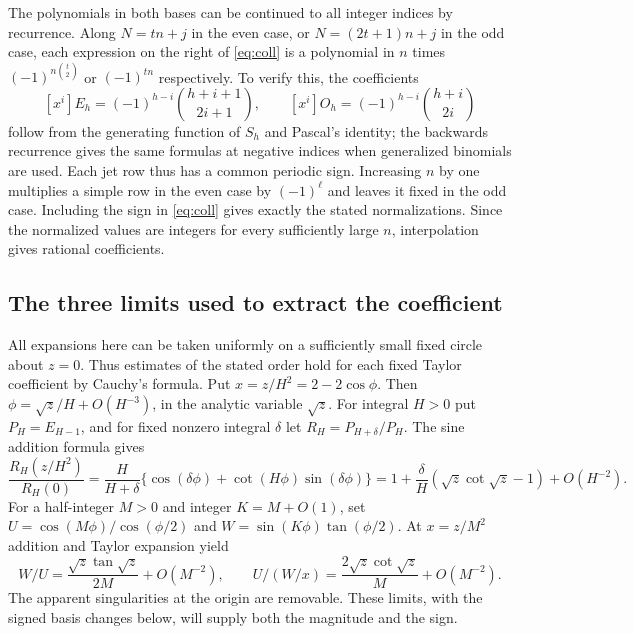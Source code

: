 \documentclass[11pt,a4paper]{article}
\begin{document}
The polynomials in both bases can be continued to all integer indices by recurrence. Along $N=tn+j$ in the even case, or $N=(2t+1)n+j$ in the odd case, each expression on the right of \eqref{eq:coll} is a polynomial in $n$ times $(-1)^{n\binom t2}$ or $(-1)^{tn}$ respectively. To verify this, the coefficients
\[
 [x^i]E_h=(-1)^{h-i}\binom{h+i+1}{2i+1},\qquad
 [x^i]O_h=(-1)^{h-i}\binom{h+i}{2i}
\]
follow from the generating function of $S_h$ and Pascal's identity; the backwards recurrence gives the same formulas at negative indices when generalized binomials are used. Each jet row thus has a common periodic sign. Increasing $n$ by one multiplies a simple row in the even case by $(-1)^\ell$ and leaves it fixed in the odd case. Including the sign in \eqref{eq:coll} gives exactly the stated normalizations. Since the normalized values are integers for every sufficiently large $n$, interpolation gives rational coefficients.

\subsection*{The three limits used to extract the coefficient}
All expansions here can be taken uniformly on a sufficiently small fixed circle about $z=0$. Thus estimates of the stated order hold for each fixed Taylor coefficient by Cauchy's formula. Put $x=z/H^2=2-2\cos\phi$. Then $\phi=\sqrt z/H+O(H^{-3})$, in the analytic variable $\sqrt z$. For integral $H>0$ put $P_H=E_{H-1}$, and for fixed nonzero integral $\delta$ let $R_H=P_{H+\delta}/P_H$. The sine addition formula gives
\[
 \frac{R_H(z/H^2)}{R_H(0)}
 =\frac{H}{H+\delta}\{\cos(\delta\phi)+\cot(H\phi)\sin(\delta\phi)\}
 =1+\frac{\delta}{H}(\sqrt z\cot\sqrt z-1)+O(H^{-2}).
\]
For a half-integer $M>0$ and integer $K=M+O(1)$, set
$U=\cos(M\phi)/\cos(\phi/2)$ and $W=\sin(K\phi)\tan(\phi/2)$.
At $x=z/M^2$ addition and Taylor expansion yield
\[
 W/U=\frac{\sqrt z\tan\sqrt z}{2M}+O(M^{-2}),\qquad
 U/(W/x)=\frac{2\sqrt z\cot\sqrt z}{M}+O(M^{-2}).
\]
The apparent singularities at the origin are removable. These limits, with the signed basis changes below, will supply both the magnitude and the sign.
\end{document}
